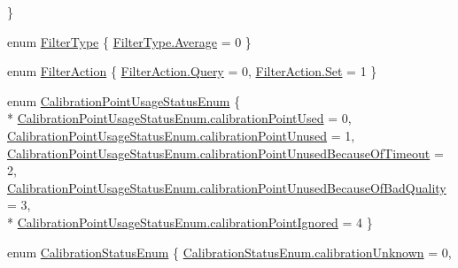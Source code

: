 \begin{DoxyCompactItemize}
 \}
\item 
enum \hyperlink{class_web_analyzer_1_1_eye_tracking_1_1_eye_tracking_controller_ad9753f580da53bc6d88c2e32a579a2cc}{Filter\+Type} \{ \hyperlink{class_web_analyzer_1_1_eye_tracking_1_1_eye_tracking_controller_ad9753f580da53bc6d88c2e32a579a2ccab1897515d548a960afe49ecf66a29021}{Filter\+Type.\+Average} = 0
 \}
\item 
enum \hyperlink{class_web_analyzer_1_1_eye_tracking_1_1_eye_tracking_controller_abb07906895fb0b4d42dda920e7e9bc1e}{Filter\+Action} \{ \hyperlink{class_web_analyzer_1_1_eye_tracking_1_1_eye_tracking_controller_abb07906895fb0b4d42dda920e7e9bc1ea66c1b4c7f3dc385b68a9fa903ccd016d}{Filter\+Action.\+Query} = 0, 
\hyperlink{class_web_analyzer_1_1_eye_tracking_1_1_eye_tracking_controller_abb07906895fb0b4d42dda920e7e9bc1ea5d5b78699e57104f2fa03bbdf7b9197b}{Filter\+Action.\+Set} = 1
 \}
\item 
enum \hyperlink{class_web_analyzer_1_1_eye_tracking_1_1_eye_tracking_controller_a36f85c58685af035bb62a9d32eb6a832}{Calibration\+Point\+Usage\+Status\+Enum} \{ \\*
\hyperlink{class_web_analyzer_1_1_eye_tracking_1_1_eye_tracking_controller_a36f85c58685af035bb62a9d32eb6a832a0f5e08b69dd523438941fe2e36980aec}{Calibration\+Point\+Usage\+Status\+Enum.\+calibration\+Point\+Used} = 0, 
\hyperlink{class_web_analyzer_1_1_eye_tracking_1_1_eye_tracking_controller_a36f85c58685af035bb62a9d32eb6a832a1b7bd071939b85cb36740268535e9e2f}{Calibration\+Point\+Usage\+Status\+Enum.\+calibration\+Point\+Unused} = 1, 
\hyperlink{class_web_analyzer_1_1_eye_tracking_1_1_eye_tracking_controller_a36f85c58685af035bb62a9d32eb6a832af389d1de4acceb795a916a2f6e60a76f}{Calibration\+Point\+Usage\+Status\+Enum.\+calibration\+Point\+Unused\+Because\+Of\+Timeout} = 2, 
\hyperlink{class_web_analyzer_1_1_eye_tracking_1_1_eye_tracking_controller_a36f85c58685af035bb62a9d32eb6a832aa5e11eb10327792d75a89347ad8e011c}{Calibration\+Point\+Usage\+Status\+Enum.\+calibration\+Point\+Unused\+Because\+Of\+Bad\+Quality} = 3, 
\\*
\hyperlink{class_web_analyzer_1_1_eye_tracking_1_1_eye_tracking_controller_a36f85c58685af035bb62a9d32eb6a832a806f0b0a59acf177046a03e8cfa58fb7}{Calibration\+Point\+Usage\+Status\+Enum.\+calibration\+Point\+Ignored} = 4
 \}
\item 
enum \hyperlink{class_web_analyzer_1_1_eye_tracking_1_1_eye_tracking_controller_a22313637b693bb7b9fd30e2d549c3eeb}{Calibration\+Status\+Enum} \{ \hyperlink{class_web_analyzer_1_1_eye_tracking_1_1_eye_tracking_controller_a22313637b693bb7b9fd30e2d549c3eeba4769fdf240378de6af05207d07c61639}{Calibration\+Status\+Enum.\+calibration\+Unknown} = 0, 

\end{DoxyCompactItemize}
